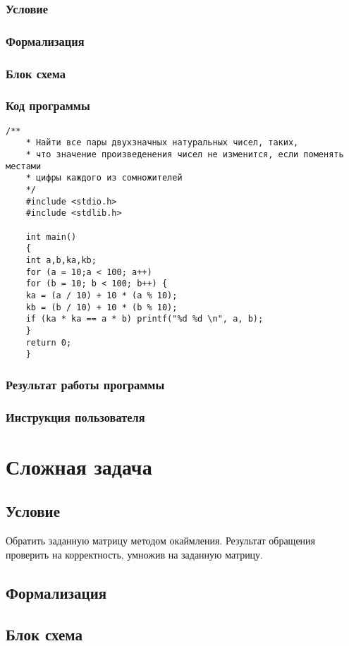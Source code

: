 \documentclass[simple,14pt]{eskdtext}
\begin{document}
	\subsubsection{Условие}
	\subsubsection{Формализация}
	\subsubsection{Блок схема}
	\subsubsection{Код программы}
	\begin{lstlisting}[label=some-code3,caption=Задача 3]
	/**
	* Найти все пары двухзначных натуральных чисел, таких,
	* что значение произведенения чисел не изменится, если поменять местами
	* цифры каждого из сомножителей
	*/
	#include <stdio.h>
	#include <stdlib.h>
	
	int main()
	{
	int a,b,ka,kb;
	for (a = 10;a < 100; a++)
	for (b = 10; b < 100; b++) {
	ka = (a / 10) + 10 * (a % 10);
	kb = (b / 10) + 10 * (b % 10);
	if (ka * ka == a * b) printf("%d %d \n", a, b);
	}
	return 0;
	}
	\end{lstlisting}
	\subsubsection{Результат работы программы}
	\subsubsection{Инструкция пользователя}
	
	\newpage
	\section{Сложная задача}
	\subsection{Условие}
	Обратить заданную матрицу методом окаймления. Результат обращения проверить на корректность, умножив на заданную матрицу. 
	\subsection{Формализация}
	
	\subsection{Блок схема}
\end{document}
